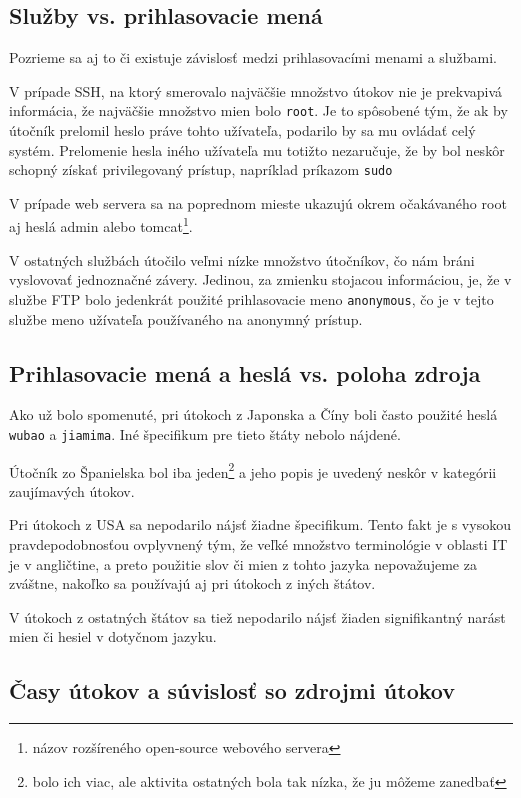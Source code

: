 \documentclass[12pt, oneside]{book}
\begin{document}
\subsection{Služby vs. prihlasovacie mená}

Pozrieme sa aj to či existuje závislosť medzi prihlasovacími menami a službami.

V prípade SSH, na ktorý smerovalo najväčšie množstvo útokov nie je prekvapivá informácia, že najväčšie množstvo mien bolo \texttt{root}.
Je to spôsobené tým, že ak by útočník prelomil heslo práve tohto užívateľa, podarilo by sa mu ovládať celý systém.
Prelomenie hesla iného užívateľa mu totižto nezaručuje, že by bol neskôr schopný získať privilegovaný prístup, napríklad príkazom \texttt{sudo}

V prípade web servera sa na poprednom mieste ukazujú okrem o\-ča\-ká\-va\-né\-ho root aj heslá admin alebo tomcat\footnote{názov rozšíreného open-source webového servera}.

V ostatných službách útočilo veľmi nízke množstvo útočníkov, čo nám bráni vyslovovať jednoznačné závery.
Jedinou, za zmienku stojacou informáciou, je, že v službe FTP bolo jedenkrát použité prihlasovacie meno \texttt{anonymous}, čo je v tejto službe meno užívateľa používaného na anonymný prístup.

\subsection{Prihlasovacie mená a heslá vs. poloha zdroja}

Ako už bolo spomenuté, pri útokoch z Japonska a Číny boli často použité heslá \texttt{wubao} a \texttt{jiamima}. Iné špecifikum pre tieto štáty nebolo nájdené.

Útočník zo Španielska bol iba jeden\footnote{bolo ich viac, ale aktivita ostatných bola tak nízka, že ju môžeme zanedbať} a jeho popis je uvedený neskôr v kategórii zaujímavých útokov.

Pri útokoch z USA sa nepodarilo nájsť žiadne špecifikum. Tento fakt je s vysokou pravdepodobnosťou ovplyvnený tým, že veľké množstvo terminológie v oblasti IT je v angličtine, a preto použitie slov či mien z tohto jazyka nepovažujeme za zváštne, nakoľko sa používajú aj pri útokoch z iných štátov.

V útokoch z ostatných štátov sa tiež nepodarilo nájsť žiaden signifikantný narást mien či hesiel v dotyčnom jazyku.

\subsection{Časy útokov a súvislosť so zdrojmi útokov}
\end{document}
